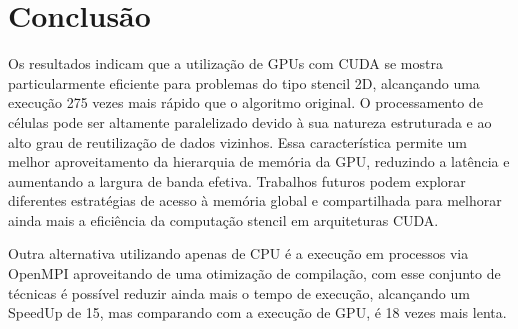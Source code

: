 \section{Conclusão}

Os resultados indicam que a utilização de GPUs com CUDA se mostra particularmente eficiente para problemas do tipo stencil 2D, alcançando uma execução 275 vezes mais rápido que o algoritmo original. O processamento de células pode ser altamente paralelizado devido à sua natureza estruturada e ao alto grau de reutilização de dados vizinhos. Essa característica permite um melhor aproveitamento da hierarquia de memória da GPU, reduzindo a latência e aumentando a largura de banda efetiva. Trabalhos futuros podem explorar diferentes estratégias de acesso à memória global e compartilhada para melhorar ainda mais a eficiência da computação stencil em arquiteturas CUDA.

Outra alternativa utilizando apenas de CPU é a execução em processos via OpenMPI aproveitando de uma otimização de compilação, com esse conjunto de técnicas é possível reduzir ainda mais o tempo de execução, alcançando um SpeedUp de 15, mas comparando com a execução de GPU, é 18 vezes mais lenta.